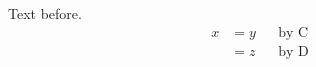 \documentclass{article}
\begin{document}
Text before.
\begin{align}
x& = y && \text{by C}\\
 & = z && \text{by D}
\end{align}
\end{document}
